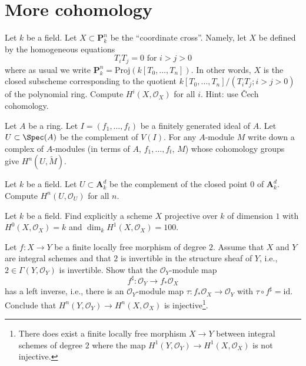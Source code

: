 \section{More cohomology}
\label{section-more-cohomology}

\begin{exercise}
\label{exercise-cohomology-coordinate-axes}
Let $k$ be a field. Let $X \subset \mathbf{P}^n_k$
be the ``coordinate cross''. Namely, let $X$ be
defined by the homogeneous equations
$$
T_i T_j = 0\text{ for }i > j > 0
$$
where as usual we write $\mathbf{P}^n_k = \text{Proj}(k[T_0, \ldots, T_n])$.
In other words,  $X$ is the closed subscheme corresponding to the quotient
$k[T_0, \ldots, T_n]/(T_iT_j; i > j > 0)$ of the polynomial ring.
Compute $H^i(X, \mathcal{O}_X)$ for all $i$. Hint: use {\v C}ech cohomology.
\end{exercise}

\begin{exercise}
\label{exercise-compute-cohomology-punctured}
Let $A$ be a ring. Let $I = (f_1, \ldots, f_t)$
be a finitely generated ideal of $A$.
Let $U \subset \Spec(A)$ be the complement of $V(I)$.
For any $A$-module $M$ write down a complex
of $A$-modules (in terms of $A$, $f_1, \ldots, f_t$, $M$)
whose cohomology groups give $H^n(U, \widetilde{M})$.
\end{exercise}

\begin{exercise}
\label{exercise-compute-cohomology-affine-space-punctured}
Let $k$ be a field. Let $U \subset \mathbf{A}^d_k$ be the
complement of the closed point $0$ of $\mathbf{A}^d_k$.
Compute $H^n(U, \mathcal{O}_U)$ for all $n$.
\end{exercise}

\begin{exercise}
\label{exercise-find-curve-genus-one-hundred}
Let $k$ be a field. Find explicitly a scheme $X$ projective over $k$
of dimension $1$ with $H^0(X, \mathcal{O}_X) = k$ and
$\dim_k H^1(X, \mathcal{O}_X) = 100$.
\end{exercise}

\begin{exercise}
\label{exercise-degree-2-cover}
Let $f : X \to Y$ be a finite locally free morphism of degree $2$.
Assume that $X$ and $Y$ are integral schemes and that $2$ is invertible
in the structure sheaf of $Y$, i.e., $2 \in \Gamma(Y, \mathcal{O}_Y)$
is invertible. Show that the $\mathcal{O}_Y$-module map
$$
f^\sharp : \mathcal{O}_Y \longrightarrow f_*\mathcal{O}_X
$$
has a left inverse, i.e., there is an $\mathcal{O}_Y$-module map
$\tau : f_*\mathcal{O}_X \to \mathcal{O}_Y$
with $\tau \circ f^\sharp = \text{id}$.
Conclude that $H^n(Y, \mathcal{O}_Y) \to H^n(X, \mathcal{O}_X)$
is injective\footnote{There does exist a finite locally free morphism
$X \to Y$ between integral schemes of degree $2$ where the map
$H^1(Y, \mathcal{O}_Y) \to H^1(X, \mathcal{O}_X)$ is not injective.}.
\end{exercise}

